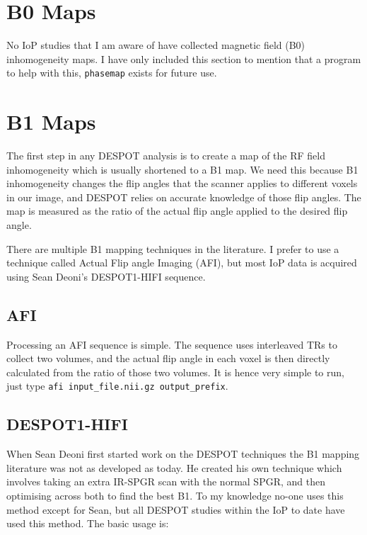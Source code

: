 \documentclass{report}
\begin{document}
\section{B0 Maps}

No IoP studies that I am aware of have collected magnetic field (B0) inhomogeneity maps. I have only included this section to mention that a program to help with this, \texttt{phasemap} exists for future use.

\section{B1 Maps}

The first step in any DESPOT analysis is to create a map of the RF field inhomogeneity which is usually shortened to a B1 map. We need this because B1 inhomogeneity changes the flip angles that the scanner applies to different voxels in our image, and DESPOT relies on accurate knowledge of those flip angles. The map is measured as the ratio of the actual flip angle applied to the desired flip angle.

There are multiple B1 mapping techniques in the literature. I prefer to use a technique called Actual Flip angle Imaging (AFI), but most IoP data is acquired using Sean Deoni's DESPOT1-HIFI sequence.

\subsection{AFI}

Processing an AFI sequence is simple. The sequence uses interleaved TRs to collect two volumes, and the actual flip angle in each voxel is then directly calculated from the ratio of those two volumes. It is hence very simple to run, just type \texttt{afi input\_file.nii.gz output\_prefix}.

\subsection{DESPOT1-HIFI}

When Sean Deoni first started work on the DESPOT techniques the B1 mapping literature was not as developed as today. He created his own technique which involves taking an extra IR-SPGR scan with the normal SPGR, and then optimising across both to find the best B1. To my knowledge no-one uses this method except for Sean, but all DESPOT studies within the IoP to date have used this method. The basic usage is:
\end{document}
